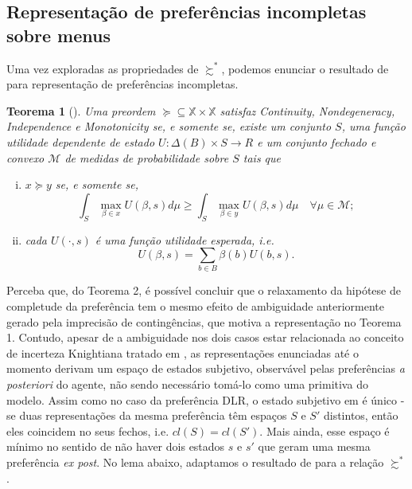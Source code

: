\documentclass[12pt, a4paper]{article}
\theoremstyle{nonumberplain}
\theoremstyle{plain}
\newtheorem{theorem}{Teorema}
\theoremstyle{plain}
\theoremstyle{plain}
\theoremstyle{nonumberplain}
\begin{document}
\subsection{Representação de preferências incompletas sobre menus}
Uma vez exploradas as propriedades de $\succsim^*$, podemos enunciar o resultado de \cite{Kochov2007} para representação de preferências incompletas.\\

\begin{theorem}[\cite{Kochov2007}]\label{kochov} Uma preordem $\succcurlyeq\subseteq\mathbb{X}\times\mathbb{X}$ satisfaz \emph{Continuity}, \emph{Nondegeneracy}, \emph{Independence} e \emph{Monotonicity} se, e somente se, existe um conjunto $S$, uma função utilidade dependente de estado $U:\Delta(B)\times S\rightarrow R$ e um conjunto fechado e convexo $\mathcal{M}$ de medidas de probabilidade sobre $S$ tais que
\begin{enumerate}[(i)]
\item $x\succcurlyeq y$ se, e somente se, $$ \int_{S} \max_{\beta\in x}U(\beta,s)d\mu \geq \int_{S} \max_{\beta\in y}U(\beta,s)d\mu\quad \forall\mu\in\mathcal{M};$$
\item cada $U(\cdot,s)$ é uma função utilidade esperada, i.e. $$U(\beta,s)=\sum_{b\in B} \beta(b)U(b,s).$$
\end{enumerate}
\end{theorem}

Perceba que, do Teorema 2, é possível concluir que o relaxamento da hipótese de completude da preferência tem o mesmo efeito de ambiguidade anteriormente gerado pela imprecisão de contingências, que motiva a representação no Teorema 1. Contudo, apesar de a ambiguidade nos dois casos estar relacionada ao conceito de incerteza Knightiana tratado em \cite{Bewley1986a}, as representações enunciadas até o momento derivam um espaço de estados subjetivo, observável pelas preferências \emph{a posteriori} do agente, não sendo necessário tomá-lo como uma primitiva do modelo.
Assim como no caso da preferência DLR, o estado subjetivo em \cite{Kochov2007} é único - se duas representações da mesma preferência têm espaços $S$ e $S'$ distintos, então eles coincidem no seus fechos, i.e. $cl(S)=cl(S')$. Mais ainda, esse espaço é mínimo no sentido de não haver dois estados $s$ e $s'$ que geram uma mesma preferência \emph{ex post}. No lema abaixo, adaptamos o resultado de \cite{Kochov2007} para a relação $\succsim^*$.
\end{document}
